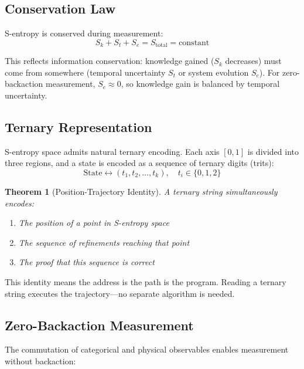 \documentclass[twocolumn,aps,prx,superscriptaddress,longbibliography]{revtex4-2}
\newtheorem{theorem}{Theorem}[section]
\theoremstyle{remark}
\newcommand{\Sk}{S_k}
\newcommand{\St}{S_t}
\newcommand{\Se}{S_e}
\begin{document}
\subsection{Conservation Law}

S-entropy is conserved during measurement:
\begin{equation}
\Sk + \St + \Se = S_\text{total} = \text{constant}
\label{eq:conservation}
\end{equation}

This reflects information conservation: knowledge gained ($\Sk$ decreases)
must come from somewhere (temporal uncertainty $\St$ or system evolution
$\Se$). For zero-backaction measurement, $\Se \approx 0$, so knowledge
gain is balanced by temporal uncertainty.

\subsection{Ternary Representation}

S-entropy space admits natural ternary encoding. Each axis $[0,1]$ is
divided into three regions, and a state is encoded as a sequence of
ternary digits (trits):
\begin{equation}
\text{State} \leftrightarrow (t_1, t_2, \ldots, t_k), \quad t_i \in \{0, 1, 2\}
\label{eq:ternary}
\end{equation}

\begin{theorem}[Position-Trajectory Identity]
\label{thm:identity}
A ternary string simultaneously encodes:
\begin{enumerate}
    \item The position of a point in S-entropy space
    \item The sequence of refinements reaching that point
    \item The proof that this sequence is correct
\end{enumerate}
\end{theorem}

This identity means the address is the path is the program. Reading a
ternary string executes the trajectory---no separate algorithm is needed.

\subsection{Zero-Backaction Measurement}

The commutation of categorical and physical observables enables
measurement without backaction:
\end{document}
